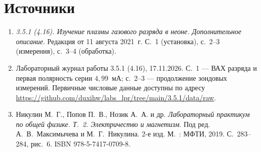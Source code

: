\section*{Источники}
\begin{enumerate}
\item \textit{3.5.1 (4.16). Изучение плазмы газового разряда в неоне.
Дополнительное описание}. Редакция от 11 августа 2021~г.
С.~1 (установка), с.~2--3 (измерения), с.~3--4 (обработка).
\item Лабораторный журнал работы 3.5.1 (4.16), 17.11.2026.
С.~1 --- ВАХ разряда и первая полярность серии $4{,}99$~мА;
с.~2--3 --- продолжение зондовых измерений. Первичные числовые данные
доступны по адресу \url{https://github.com/duxihw/labs_lpr/tree/main/3.5.1/data/raw}.
\item Никулин М.~Г., Попов П.~В., Нозик А.~А. и др.
\textit{Лабораторный практикум по общей физике. Т.~2. Электричество и магнетизм}.
Под ред. А.~В.~Максимычева и М.~Г.~Никулина. 2-е изд.
М.~: МФТИ, 2019. С.~283--284, рис.~6. ISBN 978-5-7417-0709-8.
\end{enumerate}
